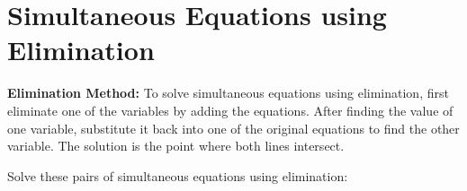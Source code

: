 \documentclass[12pt, a4paper, addpoints]{exam}
\newcommand{\elimination}[6]{%
    \pgfmathsetmacro{\cval}{#3*#1 + #4*#2} %
    \pgfmathsetmacro{\pval}{#5*#1 + #6*#2} %

    \def\formata{%
        \ifnum#3=1
            x
        \else\ifnum#3=-1
            -x
        \else
            \pgfmathprintnumber{#3}x
        \fi\fi}

    \def\formatb{%
        \ifnum#4=1
            +y
        \else\ifnum#4=-1
            -y
        \else
            \ifnum#4<0 \pgfmathprintnumber{#4}y \else +\pgfmathprintnumber{#4}y \fi
        \fi\fi}

    \def\formatd{%
        \ifnum#5=1
            x
        \else\ifnum#5=-1
            -x
        \else
            \pgfmathprintnumber{#5}x
        \fi\fi}

    \def\formate{%
        \ifnum#6=1
            +y
        \else\ifnum#6=-1
            -y
        \else
            \ifnum#6<0 \pgfmathprintnumber{#6}y \else +\pgfmathprintnumber{#6}y \fi
        \fi\fi}

    $\left\{ \begin{aligned}
    \formata \formatb &= \pgfmathprintnumber{\cval} \\[-1pt]
    \formatd \formate &= \pgfmathprintnumber{\pval}
    \end{aligned} \right.$
}
\begin{document}
\section*{Simultaneous Equations using Elimination}

\begin{mdframed}[backgroundcolor=gray!20] %
\textbf{Elimination Method:} To solve simultaneous equations using elimination, first eliminate one of the variables by adding  the equations. After finding the value of one variable, substitute it back into one of the original equations to find the other variable. The solution is the point where both lines intersect.
\end{mdframed}
\large
\begin{questions}

\question Solve these pairs of simultaneous equations using elimination:
\begin{multicols}{3} %
\end{multicols}
\end{questions}
\end{document}
